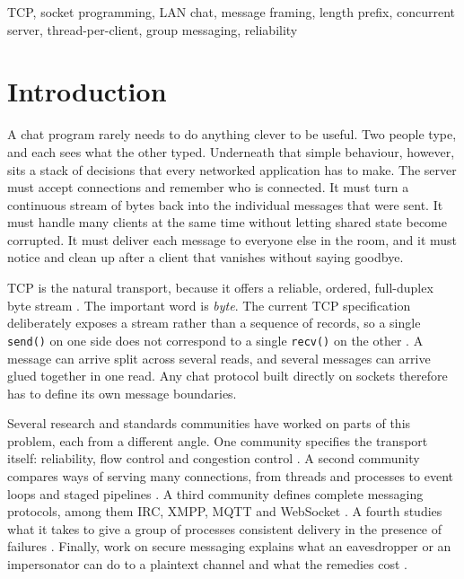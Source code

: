 \documentclass[conference]{IEEEtran}
\newcommand{\code}[1]{\texttt{#1}}
\begin{document}
\begin{IEEEkeywords}
TCP, socket programming, LAN chat, message framing, length prefix, concurrent server, thread-per-client, group messaging, reliability
\end{IEEEkeywords}

\section{Introduction}
A chat program rarely needs to do anything clever to be useful. Two people type, and each sees what the other typed. Underneath that simple behaviour, however, sits a stack of decisions that every networked application has to make. The server must accept connections and remember who is connected. It must turn a continuous stream of bytes back into the individual messages that were sent. It must handle many clients at the same time without letting shared state become corrupted. It must deliver each message to everyone else in the room, and it must notice and clean up after a client that vanishes without saying goodbye.

TCP is the natural transport, because it offers a reliable, ordered, full-duplex byte stream \cite{rfc9293,rfc793}. The important word is \emph{byte}. The current TCP specification deliberately exposes a stream rather than a sequence of records, so a single \code{send()} on one side does not correspond to a single \code{recv()} on the other \cite{rfc9293,stevens}. A message can arrive split across several reads, and several messages can arrive glued together in one read. Any chat protocol built directly on sockets therefore has to define its own message boundaries.

Several research and standards communities have worked on parts of this problem, each from a different angle. One community specifies the transport itself: reliability, flow control and congestion control \cite{rfc9293,jacobson,rfc5681}. A second community compares ways of serving many connections, from threads and processes to event loops and staged pipelines \cite{flash,seda,vonbehren,ousterhout,kegel}. A third community defines complete messaging protocols, among them IRC, XMPP, MQTT and WebSocket \cite{rfc1459,rfc6120,mqtt5,rfc6455}. A fourth studies what it takes to give a group of processes consistent delivery in the presence of failures \cite{birman87,birman93,eugster}. Finally, work on secure messaging explains what an eavesdropper or an impersonator can do to a plaintext channel and what the remedies cost \cite{rfc8446,unger,signal}.
\end{document}

